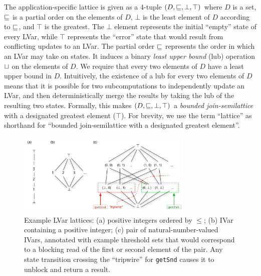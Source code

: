 \documentclass{article}
\begin{document}
The application-specific lattice is given as a 4-tuple $(D, \sqsubseteq,
\bot, \top)$ where $D$ is a set, $\sqsubseteq$ is a partial order on the
elements of $D$, $\bot$ is the least element of $D$ according to
$\sqsubseteq$, and $\top$ is the greatest.  The $\bot$ element represents
the initial ``empty'' state of every LVar, while $\top$ represents the
``error'' state that would result from conflicting updates to an LVar.
The partial order $\sqsubseteq$ represents the order in which an LVar may
take on states.  It induces a binary \emph{least upper bound} (lub)
operation $ \sqcup $ on the elements of $D$.  We require that
every two elements of $D$ have a least upper bound in $D$.
Intuitively, the existence of a lub for every two elements of $D$
means that it is possible for two subcomputations to independently
update an LVar, and then deterministically merge the results by taking
the lub of the resulting two states.  Formally, this makes $(D,
\sqsubseteq, \bot, \top)$ a \emph{bounded join-semilattice} with a
designated greatest element ($\top$).  For brevity, we use the term
``lattice'' as shorthand for ``bounded join-semilattice with a
designated greatest element''.

\begin{figure}
\centering
\includegraphics[width=0.75\textwidth]{figures/example-lvar-lattices.pdf} 
  \caption{Example LVar lattices: (a) positive integers ordered by
    $\leq$; (b) IVar containing a positive integer; (c) pair of
    natural-number-valued IVars, annotated with example threshold sets
    that would correspond to a blocking read of the first or second
    element of the pair.  Any state transition crossing the
    ``tripwire'' for \lstinline{getSnd} causes it to unblock and
    return a result.}

  \label{f:lattice-examples}
\end{figure}
\end{document}
